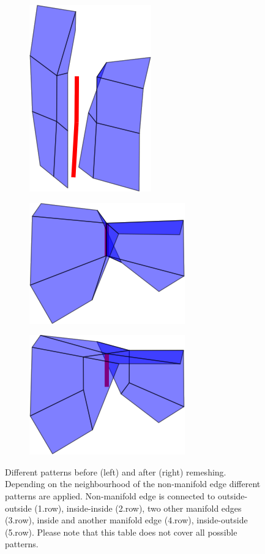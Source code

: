 \begin{figure}[p]
\begin{center}
\begin{subfigure}[b]{.45\textwidth}
\includegraphics[height = .17\textheight, width = .5\textwidth,keepaspectratio]{Pictures/SurfaceReconstruction/3DManifoldMIRes}
\end{subfigure}
\begin{subfigure}[b]{.45\textwidth}
\centering
\includegraphics[height = .17\textheight, width = .5\textwidth,keepaspectratio]{Pictures/SurfaceReconstruction/3DManifoldOI}
\end{subfigure}
\begin{subfigure}[b]{.45\textwidth}
\centering
\includegraphics[height = .17\textheight, width = .5\textwidth,keepaspectratio]{Pictures/SurfaceReconstruction/3DManifoldOIRes}
\end{subfigure}
\end{center}
\caption{Different patterns before (left) and after (right) remeshing. Depending on the neighbourhood of the non-manifold edge different patterns are applied. Non-manifold edge is connected to outside-outside (1.row), inside-inside (2.row), two other manifold edges (3.row), inside and another manifold edge (4.row), inside-outside (5.row). Please note that this table does not cover all possible patterns.}
\label{fig:manifoldPatterns3D}
\end{figure}
